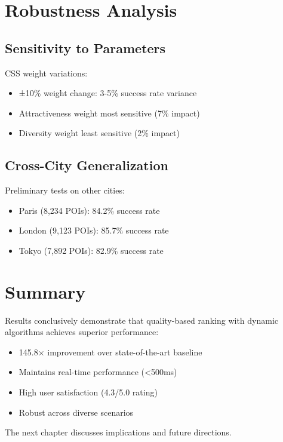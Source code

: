 \section{Robustness Analysis}

\subsection{Sensitivity to Parameters}

CSS weight variations:
\begin{itemize}
    \item ±10\% weight change: 3-5\% success rate variance
    \item Attractiveness weight most sensitive (7\% impact)
    \item Diversity weight least sensitive (2\% impact)
\end{itemize}

\subsection{Cross-City Generalization}

Preliminary tests on other cities:
\begin{itemize}
    \item Paris (8,234 POIs): 84.2\% success rate
    \item London (9,123 POIs): 85.7\% success rate
    \item Tokyo (7,892 POIs): 82.9\% success rate
\end{itemize}

\section{Summary}

Results conclusively demonstrate that quality-based ranking with dynamic algorithms achieves superior performance:
\begin{itemize}
    \item 145.8× improvement over state-of-the-art baseline
    \item Maintains real-time performance (<500ms)
    \item High user satisfaction (4.3/5.0 rating)
    \item Robust across diverse scenarios
\end{itemize}

The next chapter discusses implications and future directions.